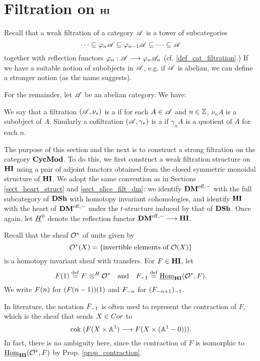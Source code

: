 \newpage
\section{Filtration on $\HI$}\label{sect_filtration_hi}

Recall that a weak filtration of a category $\Cat{A}$ is a tower 
of subcategories
\[
\cdots \subseteq \phi_n\Cat{A} \subseteq \phi_{n - 1}\Cat{A} 
   \subseteq \cdots \subseteq \Cat{A}
\]
together with reflection functors $\phi_n : \Cat{A} \to \phi_n\Cat{A}_n$
(cf. \ref{def_cat_filtration}.) If we have a suitable notion of
subobjects in $\Cat{A}$, e.g. if $\Cat{A}$ is abelian, we can 
define a stronger notion (as the name suggests).

For the remainder, let $\Cat{A}$ be an abelian category. We have:

\begin{defn}
We say that a filtration $(\Cat{A}, \nu_*)$ is a  if for each $A \in \Cat{A}$ and $n \in \Z$, $\nu_n A$ is 
a subobject of $A$. Similarly a cofiltration $(\Cat{A}, \gamma_*)$ 
is a  if $\gamma_n A$ is a quotient of 
$A$ for each $n$.
\end{defn}

The purpose of this section and the next is to construct a 
strong filtration on the category $\CycMod$. To do this, we first
construct a weak filtration structure on $\HI$ using a pair
of adjoint functors obtained from the closed symmetric monoidal 
structure of $\HI$. We adopt the same convention as in Sections
\ref{sect_heart_struct} and \ref{sect_slice_filt_dm}: we identify 
$\DMeff$ with the full subcategory of $\DSh$ with homotopy 
invariant cohomologies, and identify $\HI$ with the heart of 
$\DMeff$ under the $t$-structure induced by that of $\DSh$. Once
again, let $\sheaf{H}^0$ denote the reflection functor $\DMeff
\to \HI$.

Recall that the sheaf $\Ox$ of units given by 
\[
\Ox(X) = \{\textrm{invertible elements of }\O(X)\}
\]
is a homotopy invariant sheaf with transfers. For $F \in \HI$, 
let
\[
\LHI{F} \defeq F \tHI \Ox \hspace{10pt} \textrm{and}\hspace{10pt} 
   \RHI{F} \defeq \ihomHI(\Ox, F).  
\]
We write $\LHI[n]{F}$ for $\LHI{(\LHI[n - 1]{F})}$ and 
$\RHI[n]{F}$ for $\RHI{(\RHI[n + 1]{F})}$.

\begin{rmk}\label{rmk_contract_rhi_eq}
In literature, the notation $\RHI{F}$ is often used to represent
the contraction of $F$, which is the sheaf that sends $X \in 
\Cor$ to 
\[
\cok( F(X \times \A^1) \to F(X \times (\A^1 - 0))).
\]
In fact, there is no ambiguity here, since the contraction of
$F$ is isomorphic to $\ihomHI(\Ox, F)$ by Prop. 
\ref{prop_contraction}.
\end{rmk}

